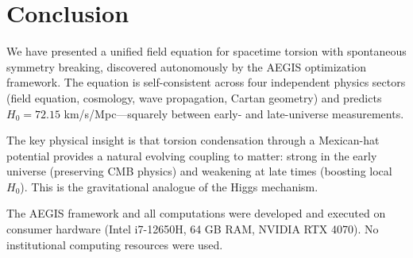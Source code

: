 \documentclass[12pt,preprint]{aastex631}
\begin{document}
\section{Conclusion}

We have presented a unified field equation for spacetime torsion
with spontaneous symmetry breaking, discovered autonomously by the
AEGIS optimization framework. The equation is self-consistent
across four independent physics sectors (field equation, cosmology,
wave propagation, Cartan geometry) and predicts $H_0 = 72.15$
km/s/Mpc---squarely between early- and late-universe measurements.

The key physical insight is that torsion condensation through
a Mexican-hat potential provides a natural evolving coupling
to matter: strong in the early universe (preserving CMB physics)
and weakening at late times (boosting local $H_0$). This is
the gravitational analogue of the Higgs mechanism.

\acknowledgments

The AEGIS framework and all computations were developed and executed
on consumer hardware (Intel i7-12650H, 64 GB RAM, NVIDIA RTX 4070).
No institutional computing resources were used.



\end{document}
